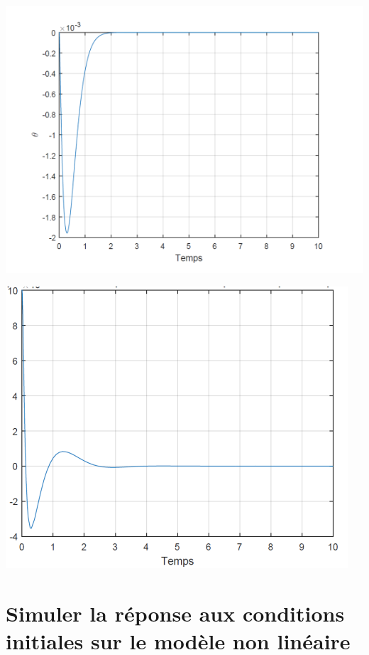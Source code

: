 \documentclass[12pt, a4paper, openany]{report}
\begin{document}
\begin{center}
{\includegraphics[scale=0.6]{figue1.png}} 
\label{figue1}
\quad

{\includegraphics[scale=0.6]{figue2.png}} 
\label{figue2}
\end{center}

    \section{Simuler la réponse aux conditions initiales sur le modèle non linéaire}
   
\end{document}
